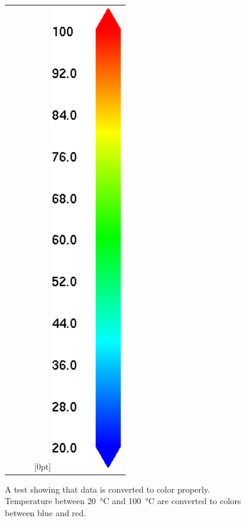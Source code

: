 \documentclass[11pt,twoside]{book}
\begin{document}
\begin{figure}[bph]
\begin{center}
\begin{tabular}{cccl}
&&&\raisebox{0.0in}[0pt]{\includegraphics[height=8.0in]{FIGURES/colorbar_20_100}}\\
\end{tabular}
\end{center}
 \caption[A test showing that data is converted to color properly]{
 A test showing that data is converted to color properly.  Temperature
 between \SI{20}{\degreeCelsius} and \SI{100}{\degreeCelsius} are
 converted to colors between blue and red.}
\label{figcolorconv}%
\end{figure}
\end{document}
